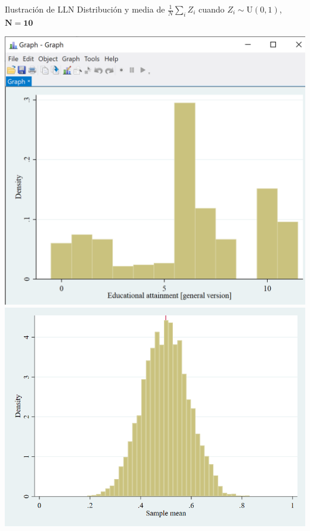 \documentclass[11pt,handout,aspectratio=169]{beamer}
\begin{document}
\begin{frame}{Ilustración de LLN}
	\vspace{0.2cm}
	Distribución y media de $\frac{1}{N}\sum_i Z_i$ cuando $Z_i\sim \mathrm{U}(0,1)$, $\mathbf{N=10}$
	
	\begin{center}
		\includegraphics[scale=0.4]{Stata6.png} \includegraphics[scale=0.25]{sims10_2.png}
	\end{center}
	
\end{frame}
\end{document}
